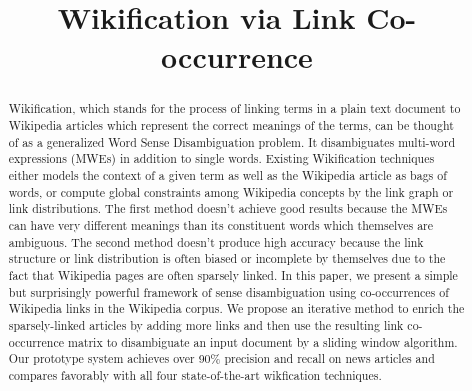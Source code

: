 \documentclass{sig-alternate}%
\begin{document}
\title{Wikification via Link Co-occurrence}
%
\maketitle

\begin{abstract}
Wikification, which stands for the process of linking terms in a
plain text document to Wikipedia articles which represent the correct
meanings of the terms, can be thought
of as a generalized Word Sense Disambiguation problem.
It disambiguates multi-word expressions (MWEs) in addition to single words.
Existing Wikification techniques either models the context of a given
term as well as the Wikipedia article as bags of words, or compute
global constraints among Wikipedia concepts by the link graph or
link distributions. The first method doesn't achieve good results
because the MWEs can have very different meanings than its constituent
words which themselves are ambiguous. The second method doesn't produce
high accuracy because the link structure or link distribution is often
biased or incomplete by themselves due to the fact that Wikipedia pages
are often sparsely linked.
In this paper, we present a simple but surprisingly powerful framework
of sense disambiguation
using co-occurrences of Wikipedia links in the Wikipedia
corpus. We propose an iterative method to enrich the sparsely-linked
articles by adding more links and then use the resulting
link co-occurrence matrix to disambiguate an input document by a sliding
window algorithm.  Our prototype system achieves over 90\% precision
and recall on news articles and compares favorably with all four
state-of-the-art wikfication techniques.
\end{abstract}
\end{document}
